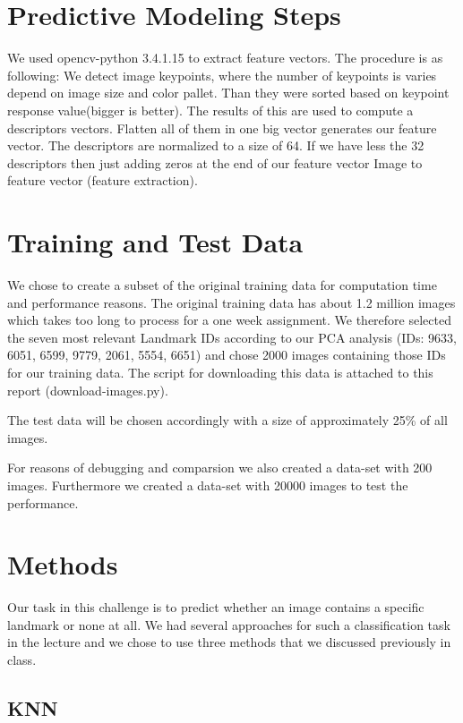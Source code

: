 \chapter{Predictive Modeling Steps}
We used opencv-python 3.4.1.15 to extract feature vectors. The procedure is as following: We detect image keypoints, where the number of keypoints is varies depend on image size and color pallet. Than they were sorted based on keypoint response value(bigger is better). The results of this are used to compute a descriptors vectors. Flatten all of them in one big vector generates our feature vector. The descriptors are normalized to a size of 64. If we have less the 32 descriptors then just adding zeros at the end of our feature vector   
Image to feature vector (feature extraction).

\chapter{Training and Test Data}

We chose to create a subset of the original training data for computation time and performance reasons. The original training data has about 1.2 million images which takes too long to process for a one week assignment. We therefore selected the seven most relevant Landmark IDs according to our PCA analysis (IDs: 9633, 6051, 6599, 9779, 2061, 5554, 6651) and chose 2000 images containing those IDs for our training data. The script for downloading this data is attached to this report (download-images.py).

The test data will be chosen accordingly with a size of approximately 25\% of all images.

For reasons of debugging and comparsion we also created a data-set with 200 images. Furthermore we created a data-set with 20000 images to test the performance.  

\chapter{Methods}

Our task in this challenge is to predict whether an image contains a specific landmark or none at all. We had several approaches for such a classification task in the lecture and we chose to use three methods that we discussed previously in class.

\section{KNN}


